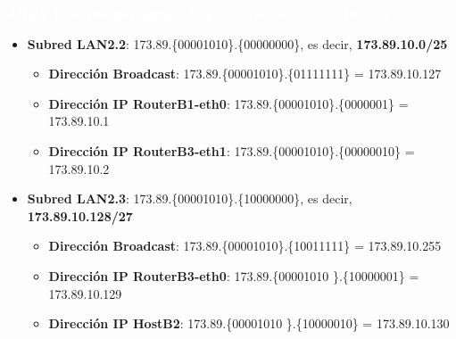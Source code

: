\par \colorbox{verdeoscuro}{\textbf{\textcolor{white}{ÁREA 1: Se pueden agregar bajo la dirección 173.89.10.0/24}}}
\begin{itemize}
	\item{\textbf{Subred LAN2.2}:} 173.89.\{\textcolor{azul}{000010}\textcolor{rojo}{10}\}.\{\textcolor{rojo}{0}0000000\}, es decir, \textbf{173.89.10.0/25}
		\begin{itemize}
			\item{\textbf{Dirección Broadcast}}: 173.89.\{\textcolor{azul}{000010}\textcolor{rojo}{10}\}.\{\textcolor{rojo}{0}1111111\} = 173.89.10.127
			\item{\textbf{Dirección IP RouterB1-eth0}}: 173.89.\{\textcolor{azul}{000010}\textcolor{rojo}{10}\}.\{\textcolor{rojo}{0}000001\} = 173.89.10.1
			\item{\textbf{Dirección IP RouterB3-eth1}}: 173.89.\{\textcolor{azul}{000010}\textcolor{rojo}{10}\}.\{\textcolor{rojo}{0}0000010\} = 173.89.10.2
		\end{itemize}
	\item{\textbf{Subred LAN2.3}:} 173.89.\{\textcolor{azul}{000010}\textcolor{rojo}{10}\}.\{\textcolor{rojo}{100}00000\}, es decir, \textbf{173.89.10.128/27}
		\begin{itemize}
			\item{\textbf{Dirección Broadcast}}: 173.89.\{\textcolor{azul}{000010}\textcolor{rojo}{10}\}.\{\textcolor{rojo}{100}11111\} = 173.89.10.255
			\item{\textbf{Dirección IP RouterB3-eth0}}: 173.89.\{\textcolor{azul}{000010}\textcolor{rojo}{10} \}.\{\textcolor{rojo}{100}00001\} = 173.89.10.129
			\item{\textbf{Dirección IP HostB2}}: 173.89.\{\textcolor{azul}{000010}\textcolor{rojo}{10} \}.\{\textcolor{rojo}{100}00010\} = 173.89.10.130
		\end{itemize}
\end{itemize}

